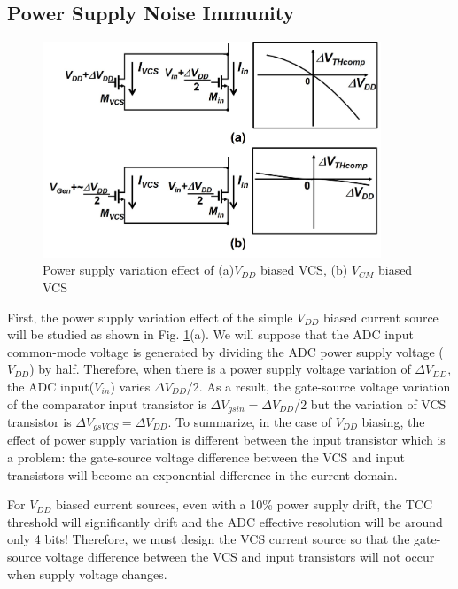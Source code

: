 \subsection{Power Supply Noise Immunity}

\begin{figure}
\centering
  \includegraphics[width=0.9\textwidth]{figure/chap4/fig8.jpg}
  \caption{Power supply variation effect of 
(a)$V_{DD}$ biased VCS,  (b) $V_{CM}$ biased VCS}
  \label{fig-4-8}
\end{figure}

First, the power supply variation effect of the simple $V_{DD}$ biased current source will be studied as shown in Fig. \ref{fig-4-8}(a). We will suppose that the ADC input common-mode voltage is generated by dividing the ADC power supply voltage ($V_{DD}$) by half. Therefore, when there is a power supply voltage variation of $\Delta V_{DD}$, the ADC input($V_{in}$) varies $\Delta V_{DD}$/2. As a result, the gate-source voltage variation of the comparator input transistor is $\Delta V_{gsin}=\Delta V_{DD}$/2 but the variation of VCS transistor is $\Delta V_{gsVCS}=\Delta V_{DD}$. 
To summarize, in the case of $V_{DD}$ biasing, the effect of power supply variation is different between the input transistor which is a problem: the gate-source voltage difference between the VCS and input transistors will become an exponential difference in the current domain. 

For $V_{DD}$ biased current sources, even with a 10\% power supply drift, the TCC threshold will significantly drift and the ADC effective resolution will be around only 4 bits! 
Therefore, we must design the VCS current source so that the gate-source voltage difference between the VCS and input transistors will not occur when supply voltage changes.

